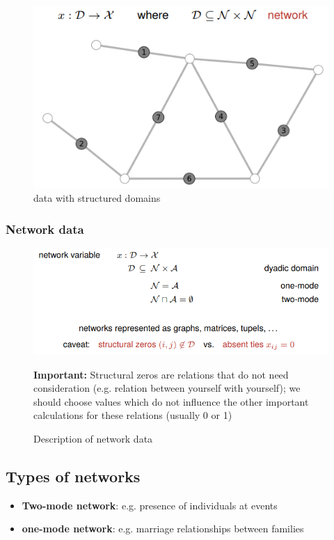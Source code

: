 \documentclass[a4paper,10pt]{article}
\begin{document}
\begin{figure}[h]
    \centering
    \includegraphics[width=0.7\linewidth]{Images/i8.png}
    \caption{data with structured domains}
    \label{fig:enter-label}
\end{figure}
\subsubsection{Network data}
\begin{figure}
    \centering
    \includegraphics[width=0.7\linewidth]{Images/i9.png}
    \caption{Description of network data}
    \label{fig:enter-label}
    \textbf{Important:} Structural zeros are relations that do not need consideration (e.g. relation between yourself with yourself); we should choose values which do not influence the other important calculations for these relations (usually 0 or 1)
\end{figure}
\subsection{Types of networks}
\begin{itemize}
    \item \textbf{Two-mode network}: e.g. presence of individuals at events
    \item \textbf{one-mode network}: e.g. marriage relationships between families
\end{itemize}
\end{document}
